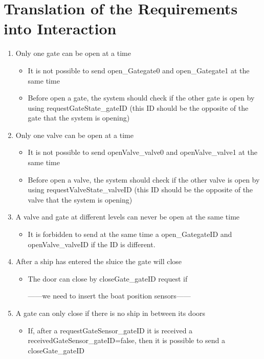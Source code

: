 \section{Translation of the Requirements into Interaction}
\begin{enumerate}
	\item Only one gate can be open at a time
	
		\begin{itemize}
			\item It is not possible to send open\_Gategate0 and open\_Gategate1 at the same time
			\item Before open a gate, the system should check if the other gate is open by using requestGateState\_gateID (this ID should be the opposite of the gate that the system is opening)
		\end{itemize}
	
	\item Only one valve can be open at a time
	
		\begin{itemize}
			\item It is not possible to send openValve\_valve0 and openValve\_valve1 at the same time
			\item Before open a valve, the system should check if the other valve is open by using requestValveState\_valveID (this ID should be the opposite of the valve that the system is opening)
		\end{itemize}
	
	\item A valve and gate at different levels can never be open at the same time
		\begin{itemize}
			\item It is forbidden to send at the same time a open\_GategateID and openValve\_valveID if the ID is different.
		\end{itemize}
	
	\item After a ship has entered the sluice the gate will close
	\begin{itemize}
		\item The door can close by closeGate\_gateID request if 
		
		------we need to insert the boat position sensors------
		
	\end{itemize}
	\item A gate can only close if there is no ship in between its doors
	\begin{itemize}
		\item If, after a requestGateSensor\_gateID it is received a receivedGateSensor\_gateID=false, then it is possible to send a closeGate\_gateID
		

\end{itemize}
\end{enumerate}
